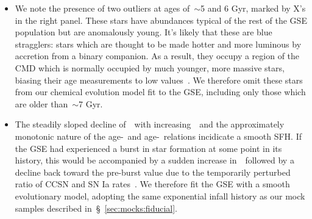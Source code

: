 \documentclass[ms.tex]{subfiles}
\begin{document}
\begin{itemize}
	\item We note the presence of two outliers at ages of~$\sim$5 and 6 Gyr,
	marked by X's in the right panel.
	These stars have abundances typical of the rest of the GSE population but
	are anomalously young.
	It's likely that these are blue stragglers: stars which are thought to be
	made hotter and more luminous by accretion from a binary companion.
	As a result, they occupy a region of the CMD which is normally occupied by
	much younger, more massive stars, biasing their age measurements to low
	values~\citep[e.g.][]{Bond1971, Stryker1993}.
	We therefore omit these stars from our chemical evolution model fit to the
	GSE, including only those which are older than~$\sim$7 Gyr.

	\item The steadily sloped decline of~\afe~with increasing~\feh~and the
	approximately monotonic nature of the age-\feh~and age-\afe~relations
	incidicate a smooth SFH.
	If the GSE had experienced a burst in star formation at some point in its
	history, this would be accompanied by a sudden increase in~\afe~followed by
	a decline back toward the pre-burst value due to the temporarily perturbed
	ratio of CCSN and SN Ia rates~\citep{Johnson2020}.
	We therefore fit the GSE with a smooth evolutionary model, adopting the
	same exponential infall history as our mock samples described
	in~\S~\ref{sec:mocks:fiducial}.


\end{itemize}
\end{document}
